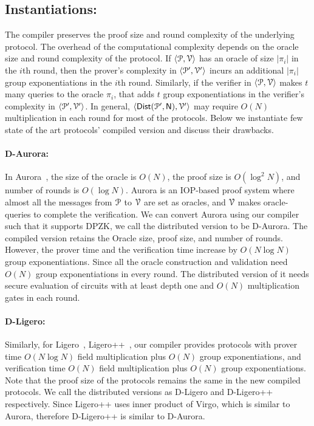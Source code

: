 \subsection{Instantiations:}\label{sec:instantiations}
The compiler preserves the proof size and round complexity of the underlying protocol. The overhead of the computational complexity depends on the oracle size and round complexity of the protocol. If $\langle \mathcal{P}, \mathcal{V} \rangle$ has an oracle of size $|\pi_i|$ in the $i$th round, then the prover's complexity in $\langle \mathcal{P}', \mathcal{V}' \rangle$ incurs an additional $|\pi_i|$ group exponentiations in the $i$th round. Similarly, if the verifier in $\langle \mathcal{P}, \mathcal{V} \rangle$ makes $t$ many queries to the oracle $\pi_i$, that adds $t$ group exponentiations in the verifier's complexity in $\langle \mathcal{P}', \mathcal{V}' \rangle$. In general, $\langle \mathsf{Dist}(\mathcal{P}', \mathsf{N}), \mathcal{V}' \rangle$ may require $O(N)$ multiplication in each round for most of the protocols.
Below we instantiate few state of the art protocols' compiled version and discuss their drawbacks.
\paragraph*{D-Aurora:}
In Aurora~\cite{aurora}, the size of the oracle is $O(N)$, the proof size is $O(\log^2 N)$, and number of rounds is $O(\log N)$. Aurora is an IOP-based proof system where almost all the messages from $\mathcal{P}$ to $\mathcal{V}$ are set as oracles, and $\mathcal{V}$ makes oracle-queries to complete the verification.
We can convert Aurora using our compiler such that it supports DPZK, we call the distributed version to be D-Aurora. The compiled version retains the Oracle size, proof size, and number of rounds. However, the prover time and the verification time increase by $O(N\log N)$ group exponentiations. Since all the oracle construction and validation need $O(N)$ group exponentiations in every round. The distributed version of it needs secure evaluation of circuits with at least depth one and $O(N)$ multiplication gates in each round.
\paragraph*{D-Ligero:}
Similarly, for Ligero~\cite{ligero}, Ligero++~\cite{ligero++}, our compiler provides protocols with  prover time $O(N\log N)$ field multiplication plus $O(N)$ group exponentiations, and verification time $O(N)$ field multiplication plus $O(N)$ group exponentiations. Note that the proof size of the protocols remains the same in the new compiled protocols. We call the distributed versions as D-Ligero and D-Ligero++ respectively. Since Ligero++ uses inner product of Virgo, which is similar to Aurora, therefore D-Ligero++ is similar to D-Aurora.

